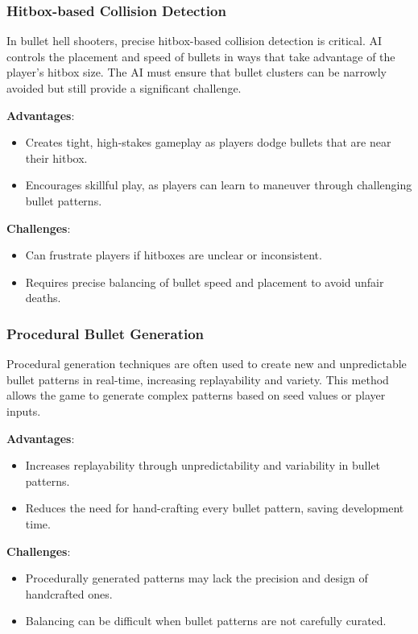 \documentclass{article} %
\begin{document}
\subsubsection{Hitbox-based Collision Detection}

In bullet hell shooters, precise hitbox-based collision detection is critical. AI controls the placement and speed of bullets in ways that take advantage of the player’s hitbox size. The AI must ensure that bullet clusters can be narrowly avoided but still provide a significant challenge.

\textbf{Advantages}:
\begin{itemize}
	\item Creates tight, high-stakes gameplay as players dodge bullets that are near their hitbox.
	\item Encourages skillful play, as players can learn to maneuver through challenging bullet patterns.
\end{itemize}

\textbf{Challenges}:
\begin{itemize}
	\item Can frustrate players if hitboxes are unclear or inconsistent.
	\item Requires precise balancing of bullet speed and placement to avoid unfair deaths.
\end{itemize}

\subsubsection{Procedural Bullet Generation}

Procedural generation techniques are often used to create new and unpredictable bullet patterns in real-time, increasing replayability and variety. This method allows the game to generate complex patterns based on seed values or player inputs.

\textbf{Advantages}:
\begin{itemize}
	\item Increases replayability through unpredictability and variability in bullet patterns.
	\item Reduces the need for hand-crafting every bullet pattern, saving development time.
\end{itemize}

\textbf{Challenges}:
\begin{itemize}
	\item Procedurally generated patterns may lack the precision and design of handcrafted ones.
	\item Balancing can be difficult when bullet patterns are not carefully curated.
\end{itemize}
\end{document}
